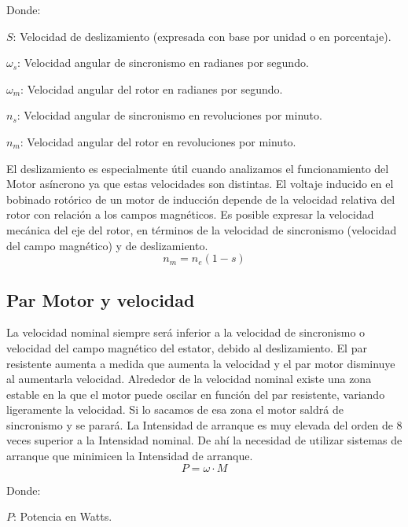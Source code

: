\documentclass[../mainnull]{subfiles}
\begin{document}
Donde:

$S$: Velocidad de deslizamiento (expresada con base por unidad o en porcentaje).

$\omega_{s}$: Velocidad angular de sincronismo en radianes por segundo.

$\omega_{m}$: Velocidad angular del rotor en radianes por segundo.

$n_{s}$: Velocidad angular de sincronismo en revoluciones por minuto.

$n_{m}$: Velocidad angular del rotor en revoluciones por minuto.

El deslizamiento es especialmente útil cuando analizamos el
funcionamiento del Motor asíncrono ya que estas velocidades son
distintas. El voltaje inducido en el bobinado rotórico de un motor de
inducción depende de la velocidad relativa del rotor con relación a
los campos magnéticos.
Es posible expresar la velocidad mecánica del eje del rotor, en
términos de la velocidad de sincronismo (velocidad del campo
magnético) y de deslizamiento.
\begin{equation}
  n_{m}=n_{e}(1-s)
\end{equation}
\subsection{Par Motor y velocidad}
La velocidad nominal siempre será inferior a la velocidad de
sincronismo o velocidad del campo magnético del estator, debido al
deslizamiento.
El par resistente aumenta a medida que aumenta la velocidad y el par
motor disminuye al aumentarla velocidad.
Alrededor de la velocidad nominal existe una zona estable  en la que
el motor puede oscilar en función del par resistente,  variando
ligeramente la velocidad. Si lo sacamos de esa zona el motor saldrá
de sincronismo y se parará.
La Intensidad de arranque es  muy elevada del orden de 8 veces
superior a la Intensidad nominal.
De ahí la necesidad de utilizar sistemas de arranque que minimicen la
Intensidad de arranque.
\begin{equation}
  P=\omega \cdot M
\end{equation}

Donde:

$P$: Potencia en Watts.
\end{document}
